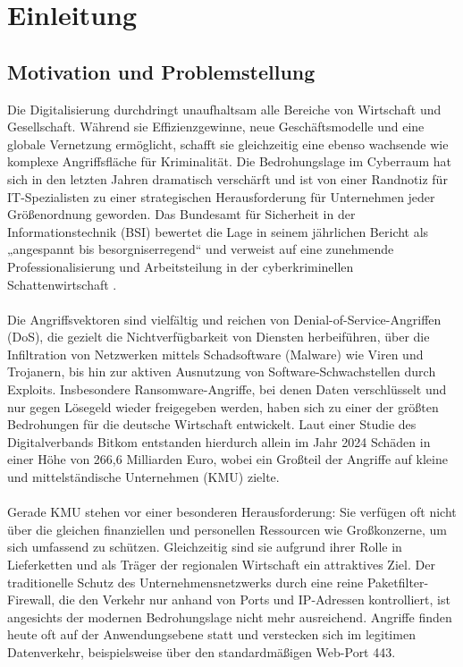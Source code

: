 \chapter{Einleitung}

\section{Motivation und Problemstellung}
Die Digitalisierung durchdringt unaufhaltsam alle Bereiche von Wirtschaft und Gesellschaft. Während sie Effizienzgewinne, neue Geschäftsmodelle und eine globale Vernetzung ermöglicht, schafft sie gleichzeitig eine ebenso wachsende wie komplexe Angriffsfläche für Kriminalität. Die Bedrohungslage im Cyberraum hat sich in den letzten Jahren dramatisch verschärft und ist von einer Randnotiz für IT-Spezialisten zu einer strategischen Herausforderung für Unternehmen jeder Größenordnung geworden. Das Bundesamt für Sicherheit in der Informationstechnik (BSI) bewertet die Lage in seinem jährlichen Bericht als „angespannt bis besorgniserregend“ und verweist auf eine zunehmende Professionalisierung und Arbeitsteilung in der cyberkriminellen Schattenwirtschaft . \cite{BSI1}
\\\\
Die Angriffsvektoren sind vielfältig und reichen von Denial-of-Service-Angriffen (DoS), die gezielt die Nichtverfügbarkeit von Diensten herbeiführen, über die Infiltration von Netzwerken mittels Schadsoftware (Malware) wie Viren und Trojanern, bis hin zur aktiven Ausnutzung von Software-Schwachstellen durch Exploits. Insbesondere Ransomware-Angriffe, bei denen Daten verschlüsselt und nur gegen Lösegeld wieder freigegeben werden, haben sich zu einer der größten Bedrohungen für die deutsche Wirtschaft entwickelt. Laut einer Studie des Digitalverbands Bitkom entstanden hierdurch allein im Jahr 2024 Schäden in einer Höhe von 266,6 Milliarden Euro, wobei ein Großteil der Angriffe auf kleine und mittelständische Unternehmen (KMU) zielte. \cite{bitkom1}
\\\\
Gerade KMU stehen vor einer besonderen Herausforderung: Sie verfügen oft nicht über die gleichen finanziellen und personellen Ressourcen wie Großkonzerne, um sich umfassend zu schützen. Gleichzeitig sind sie aufgrund ihrer Rolle in Lieferketten und als Träger der regionalen Wirtschaft ein attraktives Ziel. Der traditionelle Schutz des Unternehmensnetzwerks durch eine reine Paketfilter-Firewall, die den Verkehr nur anhand von Ports und IP-Adressen kontrolliert, ist angesichts der modernen Bedrohungslage nicht mehr ausreichend. Angriffe finden heute oft auf der Anwendungsebene statt und verstecken sich im legitimen Datenverkehr, beispielsweise über den standardmäßigen Web-Port 443.
